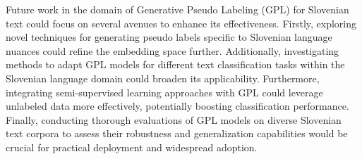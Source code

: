 \documentclass[fleqn,moreauthors,10pt]{ds_report}
\begin{document}
Future work in the domain of Generative Pseudo Labeling (GPL) for Slovenian text could focus on several avenues to enhance its effectiveness. Firstly, exploring novel techniques for generating pseudo labels specific to Slovenian language nuances could refine the embedding space further. Additionally, investigating methods to adapt GPL models for different text classification tasks within the Slovenian language domain could broaden its applicability. Furthermore, integrating semi-supervised learning approaches with GPL could leverage unlabeled data more effectively, potentially boosting classification performance. Finally, conducting thorough evaluations of GPL models on diverse Slovenian text corpora to assess their robustness and generalization capabilities would be crucial for practical deployment and widespread adoption.







\end{document}
